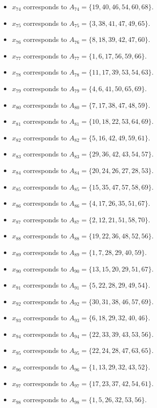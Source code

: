 \documentclass[11pt]{article}
\begin{document}
\begin{itemize}
\item $x_{74}$ corresponds to $A_{74}=\{19, 40, 46, 54, 60, 68\}$.
\item $x_{75}$ corresponds to $A_{75}=\{3, 38, 41, 47, 49, 65\}$.
\item $x_{76}$ corresponds to $A_{76}=\{8, 18, 39, 42, 47, 60\}$.
\item $x_{77}$ corresponds to $A_{77}=\{1, 6, 17, 56, 59, 66\}$.
\item $x_{78}$ corresponds to $A_{78}=\{11, 17, 39, 53, 54, 63\}$.
\item $x_{79}$ corresponds to $A_{79}=\{4, 6, 41, 50, 65, 69\}$.
\item $x_{80}$ corresponds to $A_{80}=\{7, 17, 38, 47, 48, 59\}$.
\item $x_{81}$ corresponds to $A_{81}=\{10, 18, 22, 53, 64, 69\}$.
\item $x_{82}$ corresponds to $A_{82}=\{5, 16, 42, 49, 59, 61\}$.
\item $x_{83}$ corresponds to $A_{83}=\{29, 36, 42, 43, 54, 57\}$.
\item $x_{84}$ corresponds to $A_{84}=\{20, 24, 26, 27, 28, 53\}$.
\item $x_{85}$ corresponds to $A_{85}=\{15, 35, 47, 57, 58, 69\}$.
\item $x_{86}$ corresponds to $A_{86}=\{4, 17, 26, 35, 51, 67\}$.
\item $x_{87}$ corresponds to $A_{87}=\{2, 12, 21, 51, 58, 70\}$.
\item $x_{88}$ corresponds to $A_{88}=\{19, 22, 36, 48, 52, 56\}$.
\item $x_{89}$ corresponds to $A_{89}=\{1, 7, 28, 29, 40, 59\}$.
\item $x_{90}$ corresponds to $A_{90}=\{13, 15, 20, 29, 51, 67\}$.
\item $x_{91}$ corresponds to $A_{91}=\{5, 22, 28, 29, 49, 54\}$.
\item $x_{92}$ corresponds to $A_{92}=\{30, 31, 38, 46, 57, 69\}$.
\item $x_{93}$ corresponds to $A_{93}=\{6, 18, 29, 32, 40, 46\}$.
\item $x_{94}$ corresponds to $A_{94}=\{22, 33, 39, 43, 53, 56\}$.
\item $x_{95}$ corresponds to $A_{95}=\{22, 24, 28, 47, 63, 65\}$.
\item $x_{96}$ corresponds to $A_{96}=\{1, 13, 29, 32, 43, 52\}$.
\item $x_{97}$ corresponds to $A_{97}=\{17, 23, 37, 42, 54, 61\}$.
\item $x_{98}$ corresponds to $A_{98}=\{1, 5, 26, 32, 53, 56\}$.

\end{itemize}
\end{document}
